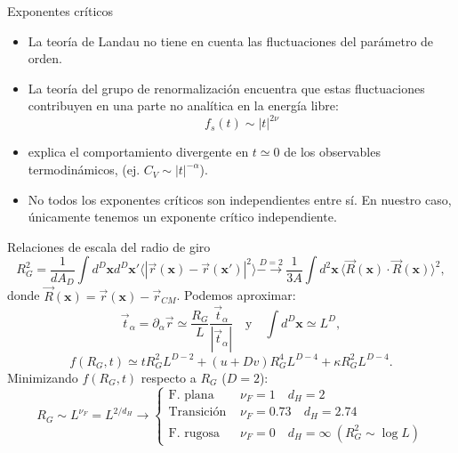 \documentclass[xcolor=dvipsnames]{beamer}
\begin{document}
\begin{frame}{Exponentes críticos}
\begin{itemize}
  \item La teoría de Landau no tiene en cuenta las fluctuaciones del parámetro de
orden.
  \item  La teoría del grupo de renormalización encuentra que
    estas fluctuaciones contribuyen en una parte no analítica en la energía
    libre:
    \begin{equation}
      f_s(t)\sim|t|^{2\nu}
    \end{equation}
  \item explica el comportamiento divergente en $t\simeq 0$ de los observables
    termodinámicos, (ej. $C_V\sim|t|^{-\alpha}$).
  \item No todos los exponentes críticos son independientes entre sí. En
    nuestro caso, únicamente tenemos un exponente crítico independiente.
\end{itemize}
\end{frame}
\begin{frame}{Relaciones de escala del radio de giro}
  \begin{equation*}
    R_G^2=\frac{1}{dA_D}\int d^D\mathbf{x}d^D\mathbf{x}' \langle |
    \vec{r}(\mathbf{x})-\vec{r}(\mathbf{x}')|^2\rangle\stackrel{D=2}{-\!\!\!\longrightarrow}\frac{1}{3A}\int d^2\mathbf{x}\, \langle
\vec{R}(\mathbf{x})\cdot\vec{R}(\mathbf{x})\rangle^2,
  \end{equation*}
donde $\vec{R}(\mathbf{x})=\vec{r}(\mathbf{x})-\vec{r}_{CM}$. Podemos aproximar:
  \begin{equation*}
    \vec{t}_{\alpha}=\partial_{\alpha} \vec{r}\simeq \frac{R_G}{L}
    \frac{\vec{t}_{\alpha}}{|\vec{t}_{\alpha}|}\quad \text{y}\quad \int
    d^D\mathbf{x}\simeq L^D,
\end{equation*}
\begin{equation*}
  f(R_G,t)\simeq t R_G^2 L^{D-2}+(u+Dv) R_G^4 L^{D-4}+\kappa R_G^2 L^{D-4}.
\end{equation*}
Minimizando $f(R_G,t)$ respecto a $R_G$ ($D=2$):
\begin{equation*}
  R_G\sim L^{\nu_F}= L^{2/d_H}\rightarrow\begin{cases}
    \text{F. plana }& \nu_F=1\quad d_H=2\\
    \text{Transición }& \nu_F=0.73\quad d_H=2.74\\
    \text{F. rugosa }& \nu_F=0\quad d_H=\infty\ (R_G^2\sim\log L)
  \end{cases}
\end{equation*}
\end{frame}
\end{document}
